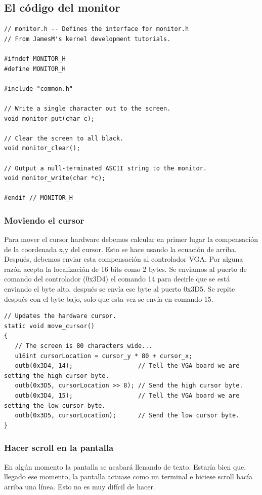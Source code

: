 \documentclass{report}
\begin{document}
\subsection{El c\'odigo del monitor}

\begin{lstlisting}
// monitor.h -- Defines the interface for monitor.h
// From JamesM's kernel development tutorials.

#ifndef MONITOR_H
#define MONITOR_H

#include "common.h"

// Write a single character out to the screen.
void monitor_put(char c);

// Clear the screen to all black.
void monitor_clear();

// Output a null-terminated ASCII string to the monitor.
void monitor_write(char *c);

#endif // MONITOR_H

\end{lstlisting}

\subsubsection{Moviendo el cursor}
Para mover el cursor hardware  debemos calcular en primer lugar la compensaci\'{o}n de la coordenada x,y del cursor. Esto se hace usando la ecuaci\'{o}n de arriba. Despu\'{e}s, debemos enviar esta compensaci\'{o}n al controlador VGA. Por alguna raz\'{o}n acepta la localizaci\'{o}n de 16 bits como 2 bytes. Se enviamos al puerto de comando del controlador (0x3D4) el comando 14 para decirle que se est\'{a} enviando el byte alto, despu\'{e}s se env\'{i}a ese byte al puerto 0x3D5. Se repite despu\'{e}s con el byte bajo, solo que esta vez se env\'{i}a en comando 15.

\begin{lstlisting}
// Updates the hardware cursor.
static void move_cursor()
{
   // The screen is 80 characters wide...
   u16int cursorLocation = cursor_y * 80 + cursor_x;
   outb(0x3D4, 14);                  // Tell the VGA board we are setting the high cursor byte.
   outb(0x3D5, cursorLocation >> 8); // Send the high cursor byte.
   outb(0x3D4, 15);                  // Tell the VGA board we are setting the low cursor byte.
   outb(0x3D5, cursorLocation);      // Send the low cursor byte.
}
\end{lstlisting}

\subsubsection{Hacer scroll en la pantalla}
En alg\'{u}n momento la pantalla se acabar\'{a} llenando de texto. Estar\'{i}a bien que, llegado ese momento, la pantalla actuase como un terminal e hiciese scroll hac\'{i}a arriba una l\'{i}nea. Esto no es muy dif\'{i}cil de hacer.
\end{document}
